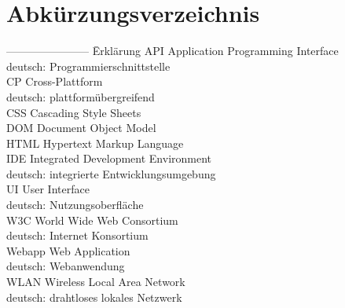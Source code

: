 \documentclass[a4paper]{scrartcl}
\begin{document}
\newpage

\section*{Abkürzungsverzeichnis}


\begin{tabbing}
	----------------------- \= Erklärung \kill
	API \> Application Programming Interface \\
	\> deutsch: Programmierschnittstelle \\
	CP \> Cross-Plattform \\
	\> deutsch: plattformübergreifend \\
	CSS \> Cascading Style Sheets \\
	DOM \> Document Object Model \\
	HTML \> Hypertext Markup Language \\
	IDE \> Integrated Development Environment \\
	\> deutsch: integrierte Entwicklungsumgebung \\
	UI \> User Interface \\
	\> deutsch: Nutzungsoberfläche \\
	W3C \> World Wide Web Consortium \\
	\> deutsch: Internet Konsortium \\
	Webapp \> Web Application \\
	\> deutsch: Webanwendung \\
	WLAN \> Wireless Local Area Network \\
	\> deutsch: drahtloses lokales Netzwerk \\
	
\end{tabbing}


\newpage

\listoffigures


\newpage

\listoftables


\newpage

\setcounter{page}{1}

\end{document}
